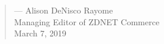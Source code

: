 \documentclass[12pt]{article}
\begin{document}
\begin{formal}
\begin{quote}
\begin{minipage}{\linewidth}
\begin{flushright}
--- Alison DeNisco Rayome\\ 
Managing Editor of ZDNET Commerce\\
March 7, 2019
\end{flushright}
\vspace{10pt}
\end{minipage}
\end{quote}
\end{formal}                                        
                   
     
     \nocite{*}
     
     \raggedright
     
     
     
     
     
     
\end{document}

